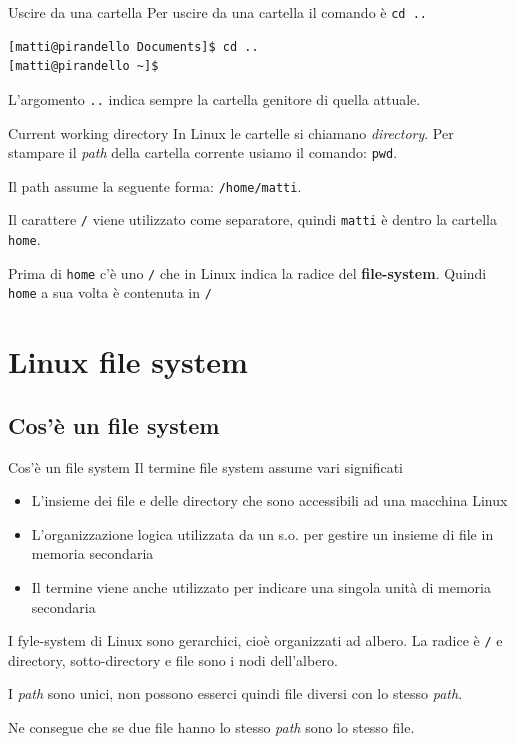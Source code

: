 \documentclass{beamer}
\begin{document}
\begin{frame}[fragile]{Uscire da una cartella}
  Per uscire da una cartella il comando è \texttt{cd ..}\bigskip
    \begin{lstlisting}
[matti@pirandello Documents]$ cd ..
[matti@pirandello ~]$
    \end{lstlisting}

  L'argomento \texttt{..} indica sempre la cartella genitore di quella attuale.
\end{frame}

\begin{frame}{Current working directory}
  In Linux le cartelle si chiamano \textit{directory}. Per stampare il 
  \textit{path} della cartella corrente usiamo il comando: \texttt{pwd}.\bigskip

  Il path assume la seguente forma: \texttt{/home/matti}.\bigskip

  Il carattere \texttt{/} viene utilizzato come separatore, quindi \texttt{matti}
  è dentro la cartella \texttt{home}. \bigskip 

  Prima di \texttt{home} c'è uno \texttt{/}
  che in Linux indica la radice del \textbf{file-system}. Quindi \texttt{home} a sua
  volta è contenuta in \texttt{/}
\end{frame}

\section{Linux file system}

\subsection{Cos'è un file system}
\begin{frame}{Cos'è un file system}
  Il termine file system assume vari significati
  \begin{itemize}
    \item L'insieme dei file e delle directory che sono accessibili ad una macchina Linux
    \item L'organizzazione logica utilizzata da un s.o. per gestire un insieme di file in
memoria secondaria
    \item Il termine viene anche utilizzato per indicare una singola unità di memoria
secondaria
  \end{itemize}

  I fyle-system di Linux sono gerarchici, cioè organizzati ad albero. La radice
  è \texttt{/} e directory, sotto-directory e file sono i nodi dell'albero. \bigskip

  I \textit{path} sono unici, non possono esserci quindi file diversi con lo 
  stesso \textit{path}. \bigskip

  Ne consegue che se due file hanno lo stesso \textit{path} sono lo stesso file.
  \bigskip
\end{frame}
\end{document}

